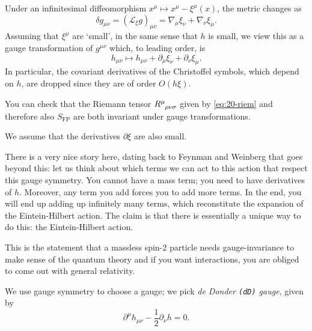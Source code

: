 Under an infinitesimal diffeomorphism $x^{\mu} \mapsto x^{\mu} - \xi^{\mu} (x)$, the metric changes as 
\begin{equation}
  \delta g_{\mu\nu} = (\mathcal{L}_{\xi} g)_{\mu\nu} = \nabla_{\mu} \xi_{\nu} + \nabla_{\nu} \xi_{\mu}.
\end{equation}
Assuming that $\xi^{\mu}$ are `small', in the same sense that $h$ is small, we view this as a gauge transformation of $g^{\mu\nu}$ which, to leading order, is
\begin{equation}
  h_{\mu\nu} \mapsto h_{\mu\nu} + \partial_{\mu} \xi_{\nu} + \partial_{\nu} \xi_{\mu}.
\end{equation}
In particular, the covariant derivatives of the Christoffel symbols, which depend on $h$, are dropped since they are of order $O(h \xi)$.

\begin{exercise}
  You can check that the Riemann tensor $R\indices{^{\mu}_{\rho\nu\sigma}}$ given by \eqref{eq:20-riem} and therefore also $S_{\text{FP}}$ are both invariant under gauge transformations.
\end{exercise}

\begin{leftbar}
  \begin{note}
    We assume that the derivatives $\partial \xi$ are also small.
  \end{note}
\end{leftbar}

\begin{remark}
  There is a very nice story here, dating back to Feynman and Weinberg that goes beyond this: let us think about which terms we can act to this action that respect this gauge symmetry.
  You cannot have a mass term; you need to have derivatives of $h$. Moreover, any term you add forces you to add more terms. In the end, you will end up adding up infinitely many terms, which reconstitute the expansion of the Eintein-Hilbert action.
  The claim is that there is essentially a unique way to do this: the Eintein-Hilbert action.

  This is the statement that a massless spin-$2$ particle needs gauge-invariance to make sense of the quantum theory and if you want interactions, you are obliged to come out with general relativity.
\end{remark}

We use gauge symmetry to choose a gauge; we pick \emph{de Donder \texttt{(dD)} gauge}, given by
\begin{equation}
  \partial^{\mu} h_{\mu\nu} - \frac{1}{2} \partial_{\nu} h = 0.
\end{equation}

